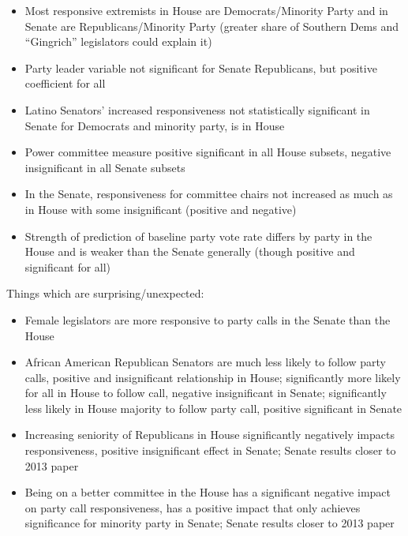 \documentclass[12pt]{article}
\begin{document}
\begin{itemize}
	
	\item Most responsive extremists in House are Democrats/Minority Party and in Senate are Republicans/Minority Party (greater share of Southern Dems and ``Gingrich'' legislators could explain it)
	
	\item Party leader variable not significant for Senate Republicans, but positive coefficient for all
	
	\item Latino Senators' increased responsiveness not statistically significant in Senate for Democrats and minority party, is in House
	
	\item Power committee measure positive significant in all House subsets, negative insignificant in all Senate subsets
	
	\item In the Senate, responsiveness for committee chairs not increased as much as in House with some insignificant (positive and negative)
	
	\item Strength of prediction of baseline party vote rate differs by party in the House and is weaker than the Senate generally (though positive and significant for all)
	
\end{itemize}

\noindent
Things which are surprising/unexpected:

\begin{itemize}	
	
	\item Female legislators are more responsive to party calls in the Senate than the House 
	
	\item African American Republican Senators are much less likely to follow party calls, positive and insignificant relationship in House; significantly more likely for all in House to follow call, negative insignificant in Senate; significantly less likely in House majority to follow party call, positive significant in Senate
	
	\item Increasing seniority of Republicans in House significantly negatively impacts responsiveness, positive insignificant effect in Senate; Senate results closer to 2013 paper
	
	\item Being on a better committee in the House has a significant negative impact on party call responsiveness, has a positive impact that only achieves significance for minority party in Senate;
	Senate results closer to 2013 paper
	
\end{itemize}
\end{document}
